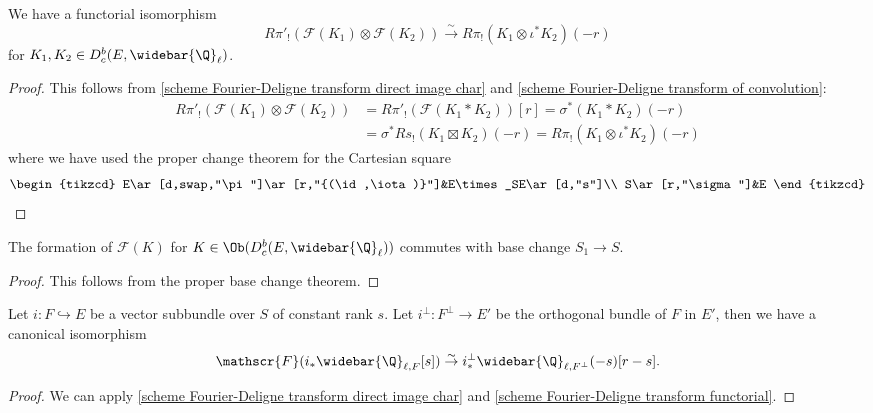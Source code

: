 \begin{proposition}\label{scheme Fourier-Deligne transform Plancherel formula}
We have a functorial isomorphism
\[R\pi'_!(\mathscr{F}(K_1)\otimes\mathscr{F}(K_2))\stackrel{\sim}{\to} R\pi_!(K_1\otimes\iota^*K_2)(-r)\]
for $K_1,K_2\in D^b_c(E,\widebar{\Q}_\ell)$.
\end{proposition}
\begin{proof}
This follows from \cref{scheme Fourier-Deligne transform direct image char} and \cref{scheme Fourier-Deligne transform of convolution}:
\begin{align*}
R\pi'_!(\mathscr{F}(K_1)\otimes\mathscr{F}(K_2))&=R\pi'_!(\mathscr{F}(K_1\ast K_2))[r]=\sigma^*(K_1\ast K_2)(-r)\\
&=\sigma^*Rs_!(K_1\boxtimes K_2)(-r)=R\pi_!(K_1\otimes\iota^*K_2)(-r)
\end{align*}
where we have used the proper change theorem for the Cartesian square
\begin{equation*}
\begin{tikzcd}
E\ar[d,swap,"\pi"]\ar[r,"{(\id,\iota)}"]&E\times_SE\ar[d,"s"]\\
S\ar[r,"\sigma"]&E
\end{tikzcd}\qedhere
\end{equation*}
\end{proof}

\begin{proposition}\label{scheme Fourier-Deligne transform base change commutes}
The formation of $\mathscr{F}(K)$ for $K\in\Ob(D^b_c(E,\widebar{\Q}_\ell))$ commutes with base change $S_1\to S$.
\end{proposition}
\begin{proof}
This follows from the proper base change theorem.
\end{proof}

\begin{proposition}\label{scheme Fourier-Deligne transform of orthogonal bundle prop}
Let $i:F\hookrightarrow E$ be a vector subbundle over $S$ of constant rank $s$. Let $i^\bot:F^\bot\to E'$ be the orthogonal bundle of $F$ in $E'$, then we have a canonical isomorphism
\[\mathscr{F}(i_*\widebar{\Q}_{\ell,F}[s])\stackrel{\sim}{\to}i^\bot_*\widebar{\Q}_{\ell,F^\bot}(-s)[r-s].\]
\end{proposition}
\begin{proof}
We can apply \cref{scheme Fourier-Deligne transform direct image char} and \cref{scheme Fourier-Deligne transform functorial}.
\end{proof}

